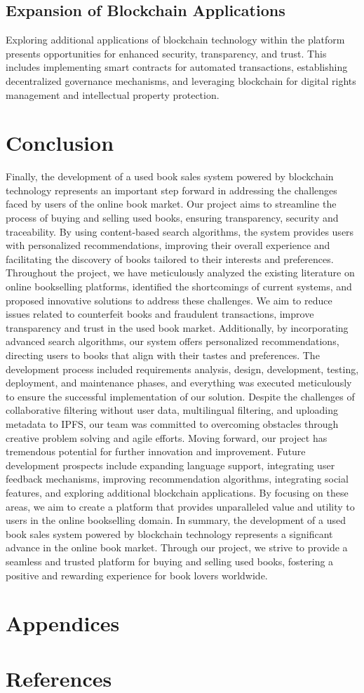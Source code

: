 \documentclass{article}
\begin{document}
\subsection{Expansion of Blockchain Applications}

Exploring additional applications of blockchain technology within the platform presents opportunities for enhanced security, transparency, and trust. This includes implementing smart contracts for automated transactions, establishing decentralized governance mechanisms, and leveraging blockchain for digital rights management and intellectual property protection.


\section{Conclusion}
Finally, the development of a used book sales system powered by blockchain technology represents an important step forward in addressing the challenges faced by users of the online book market. Our project aims to streamline the process of buying and selling used books, ensuring transparency, security and traceability.
By using content-based search algorithms, the system provides users with personalized recommendations, improving their overall experience and facilitating the discovery of books tailored to their interests and preferences.
Throughout the project, we have meticulously analyzed the existing literature on online bookselling platforms, identified the shortcomings of current systems, and proposed innovative solutions to address these challenges. We aim to reduce issues related to counterfeit books and fraudulent transactions, improve transparency and trust in the used book market.
Additionally, by incorporating advanced search algorithms, our system offers personalized recommendations, directing users to books that align with their tastes and preferences.
The development process included requirements analysis, design, development, testing, deployment, and maintenance phases, and everything was executed meticulously to ensure the successful implementation of our solution.
Despite the challenges of collaborative filtering without user data, multilingual filtering, and uploading metadata to IPFS, our team was committed to overcoming obstacles through creative problem solving and agile efforts.
Moving forward, our project has tremendous potential for further innovation and improvement. Future development prospects include expanding language support, integrating user feedback mechanisms, improving recommendation algorithms, integrating social features, and exploring additional blockchain applications.
By focusing on these areas, we aim to create a platform that provides unparalleled value and utility to users in the online bookselling domain.
In summary, the development of a used book sales system powered by blockchain technology represents a significant advance in the online book market.
Through our project, we strive to provide a seamless and trusted platform for buying and selling used books, fostering a positive and rewarding experience for book lovers worldwide.

\section{Appendices}

\section{References}
\end{document}
